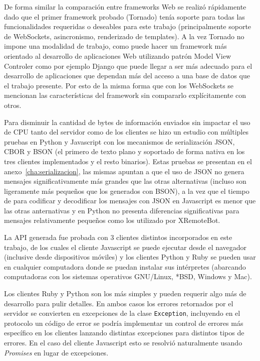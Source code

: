 De forma similar la comparación entre frameworks Web se realizó rápidamente
dado que el primer framework probado (Tornado) tenía soporte para todas
las funcionalidades requeridas o deseables para este trabajo (principalmente
soporte de WebSockets, asincronismo, renderizado de templates).
A la vez Tornado no impone
una modalidad de trabajo, como puede hacer un framework más orientado al
desarrollo de aplicaciones Web utilizando patrón Model View Controler
como por ejemplo Django que puede llegar a ser más adecuado para el desarrollo
de aplicaciones que dependan más del acceso a una base de datos que el
trabajo presente. Por esto de la misma forma que con los WebSockets se mencionan
las características del framework sin compararlo explícitamente con otros.

Para disminuir la cantidad de bytes de información enviados sin impactar el
uso de CPU tanto del servidor como de los clientes se hizo un estudio con
múltiples pruebas en Python y Javascript con los mecanismos de serialización
JSON, CBOR y BSON (el primero de texto plano y soportado de forma nativa en los
tres clientes implementados y el resto binarios). Estas pruebas se presentan
en el anexo~\ref{cha:serializacion}, las mismas apuntan a que el uso de JSON
no genera mensajes significativamente más grandes que las otras alternativas
(incluso son ligeramente más pequeños que los generados con BSON), a la vez
que el tiempo de para codificar y decodificar los mensajes con JSON en
Javascript es menor que las otras anternativas y en Python no presenta
diferencias significativas para mensajes relativamente pequeños como los utilizado
por XRemoteBot.

La API generada fue probada con 3 clientes distintos incorporados en este
trabajo, de los cuales el cliente Javascript se puede ejecutar desde el
navegador (inclusive desde dispositivos móviles) y los clientes Python y
Ruby se pueden usar en cualquier computadora
donde se puedan instalar sus intérpretes (abarcando computadoras con
los sistemas operativos GNU/Linux, *BSD, Windows y Mac).

Los clientes Ruby y Python son los más simples y pueden requerir algo
más de desarrollo para pulir detalles. En ambos casos los errores
retornados por el servidor se convierten en excepciones de la clase
\texttt{Exception}, incluyendo en el protocolo un código de error
se podría implementar un control de errores más específico en
los clientes lanzando distintas excepciones para distintos tipos
de errores. En el caso del cliente Javascript esto se resolvió
naturalmente usando \textit{Promises} en lugar de excepciones.

